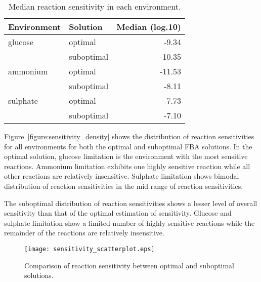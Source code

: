 \begin{table}%
  \centering
  \begin{tabular}{l l r}
                                                  \toprule
    Environment & Solution   & Median (log.10) \\ \midrule
    glucose     & optimal    &  -9.34          \\
                & suboptimal & -10.35          \\
    ammonium    & optimal    & -11.53          \\
                & suboptimal &  -8.11          \\
    sulphate    & optimal    &  -7.73          \\
                & suboptimal &  -7.10          \\ \bottomrule
  \end{tabular}
  \caption[Median reaction sensitivities]{Median reaction sensitivity in each environment. }
  \label{table:median_sensitivity}
\end{table}%

Figure~\vref{figure:sensitivity_density} shows the distribution of reaction sensitivities for all environments for both the optimal and suboptimal FBA solutions. In the optimal solution, glucose limitation is the environment with the most sensitive reactions. Ammonium limitation exhibits one highly sensitive reaction while all other reactions are relatively insensitive. Sulphate limitation shows bimodal distribution of reaction sensitivities in the mid range of reaction sensitivities. 

The suboptimal distribution of reaction sensitivities shows a lesser level of overall sensitivity than that of the optimal estimation of sensitivity. Glucose and sulphate limitation show a limited number of highly sensitive reactions while the remainder of the reactions are relatively insensitive.

\begin{figure}%
  \centering
  \texttt{[image: sensitivity\_scatterplot.eps]}
  \caption[Comparison of reaction sensitivity between optimal and suboptimal solutions]{Comparison of reaction sensitivity between optimal and suboptimal solutions. }
  \label{figure:sensitivity_scatterplot}
\end{figure}%


